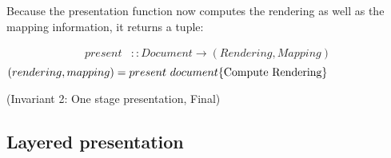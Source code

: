 \documentclass[twoside,epsf]{report}
\begin{document}
Because the presentation function now computes the rendering as well as the mapping information, it returns a tuple:\begin{small}\begin{align*} %
present & :: Document \rightarrow (Rendering, Mapping) \\
\end{align*}
\begin{math}
(rendering, mapping) = present~document
\hfill \text{\{Compute Rendering\}}
\end{math}\end{small}

{\centering (Invariant 2: One stage presentation, Final)\\}\vspace{1em}
\subsection{Layered presentation}
\end{document}
